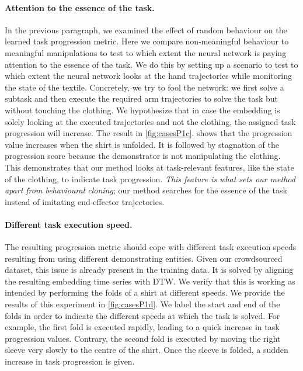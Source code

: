 \documentclass[\home/main.tex]{subfiles}
\begin{document}
\paragraph{Attention to the essence of the task.}
In the previous paragraph, we examined the effect of random behaviour on the learned task progression metric. Here we compare non-meaningful behaviour to meaningful manipulations to test to which extent the neural network is paying attention to the essence of the task. We do this by setting up a scenario to test to which extent the neural network looks at the hand trajectories while monitoring the state of the textile. Concretely, we try to fool the network: we first solve a subtask and then execute the required arm trajectories to solve the task but without touching the clothing. We hypothesize that in case the embedding is solely looking at the executed trajectories and not the clothing, the assigned task progression will increase. The result in \cref{fig:casesP1c}. shows that the progression value increases when the shirt is unfolded. It is followed by stagnation of the progression score because the demonstrator is not manipulating the clothing. This demonstrates that our method looks at task-relevant features, like the state of the clothing, to indicate task progression. \emph{This feature is what sets our method apart from behavioural cloning}; our method searches for the essence of the task instead of imitating end-effector trajectories.

\paragraph{Different task execution speed.}
The resulting progression metric should cope with different task execution speeds resulting from using different demonstrating entities. Given our crowdsourced dataset, this issue is already present in the training data. It is solved by aligning the resulting embedding time series with DTW. We verify that this is working as intended by performing the folds of a shirt at different speeds. We provide the results of this experiment in \cref{fig:casesP1d}. We label the start and end of the folds in order to indicate the different speeds at which the task is solved. For example, the first fold is executed rapidly, leading to a quick increase in task progression values. Contrary, the second fold is executed by moving the right sleeve very slowly to the centre of the shirt. Once the sleeve is folded, a sudden increase in task progression is given.
\end{document}
